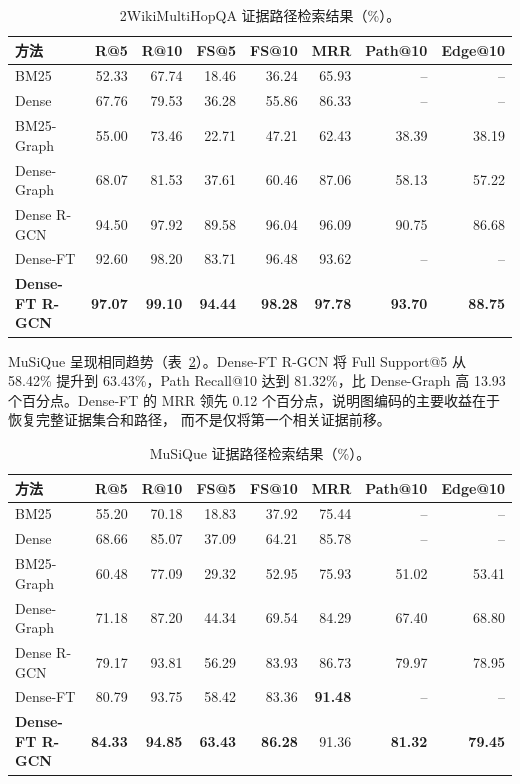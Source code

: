 \begin{table}[t]
\centering
\small
\setlength{\tabcolsep}{4pt}
\caption{2WikiMultiHopQA 证据路径检索结果（\%）。}
\label{tab:2wiki}
\begin{tabular}{lrrrrrrr}
\hline
方法 & R@5 & R@10 & FS@5 & FS@10 & MRR & Path@10 & Edge@10 \\
\hline
BM25 & 52.33 & 67.74 & 18.46 & 36.24 & 65.93 & -- & -- \\
Dense & 67.76 & 79.53 & 36.28 & 55.86 & 86.33 & -- & -- \\
BM25-Graph & 55.00 & 73.46 & 22.71 & 47.21 & 62.43 & 38.39 & 38.19 \\
Dense-Graph & 68.07 & 81.53 & 37.61 & 60.46 & 87.06 & 58.13 & 57.22 \\
Dense R-GCN & 94.50 & 97.92 & 89.58 & 96.04 & 96.09 & 90.75 & 86.68 \\
Dense-FT & 92.60 & 98.20 & 83.71 & 96.48 & 93.62 & -- & -- \\
\textbf{Dense-FT R-GCN} & \textbf{97.07} & \textbf{99.10} &
\textbf{94.44} & \textbf{98.28} & \textbf{97.78} &
\textbf{93.70} & \textbf{88.75} \\
\hline
\end{tabular}
\end{table}

MuSiQue 呈现相同趋势（表~\ref{tab:musique}）。Dense-FT R-GCN 将
Full Support@5 从 58.42\% 提升到 63.43\%，Path Recall@10 达到
81.32\%，比 Dense-Graph 高 13.93 个百分点。Dense-FT 的 MRR 领先
0.12 个百分点，说明图编码的主要收益在于恢复完整证据集合和路径，
而不是仅将第一个相关证据前移。

\begin{table}[t]
\centering
\small
\setlength{\tabcolsep}{4pt}
\caption{MuSiQue 证据路径检索结果（\%）。}
\label{tab:musique}
\begin{tabular}{lrrrrrrr}
\hline
方法 & R@5 & R@10 & FS@5 & FS@10 & MRR & Path@10 & Edge@10 \\
\hline
BM25 & 55.20 & 70.18 & 18.83 & 37.92 & 75.44 & -- & -- \\
Dense & 68.66 & 85.07 & 37.09 & 64.21 & 85.78 & -- & -- \\
BM25-Graph & 60.48 & 77.09 & 29.32 & 52.95 & 75.93 & 51.02 & 53.41 \\
Dense-Graph & 71.18 & 87.20 & 44.34 & 69.54 & 84.29 & 67.40 & 68.80 \\
Dense R-GCN & 79.17 & 93.81 & 56.29 & 83.93 & 86.73 & 79.97 & 78.95 \\
Dense-FT & 80.79 & 93.75 & 58.42 & 83.36 & \textbf{91.48} & -- & -- \\
\textbf{Dense-FT R-GCN} & \textbf{84.33} & \textbf{94.85} &
\textbf{63.43} & \textbf{86.28} & 91.36 &
\textbf{81.32} & \textbf{79.45} \\
\hline
\end{tabular}
\end{table}

